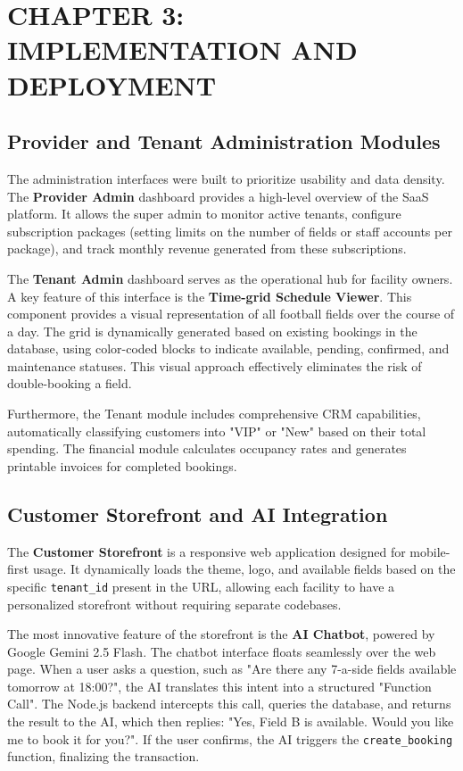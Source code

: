 \section*{CHAPTER 3: IMPLEMENTATION AND DEPLOYMENT}
\setcounter{section}{3}
\setcounter{subsection}{0}
\setcounter{figure}{0}
\setcounter{table}{0}

\subsection{Provider and Tenant Administration Modules}

The administration interfaces were built to prioritize usability and data density. The \textbf{Provider Admin} dashboard provides a high-level overview of the SaaS platform. It allows the super admin to monitor active tenants, configure subscription packages (setting limits on the number of fields or staff accounts per package), and track monthly revenue generated from these subscriptions.

The \textbf{Tenant Admin} dashboard serves as the operational hub for facility owners. A key feature of this interface is the \textbf{Time-grid Schedule Viewer}. This component provides a visual representation of all football fields over the course of a day. The grid is dynamically generated based on existing bookings in the database, using color-coded blocks to indicate available, pending, confirmed, and maintenance statuses. This visual approach effectively eliminates the risk of double-booking a field.

Furthermore, the Tenant module includes comprehensive CRM capabilities, automatically classifying customers into "VIP" or "New" based on their total spending. The financial module calculates occupancy rates and generates printable invoices for completed bookings.

\subsection{Customer Storefront and AI Integration}

The \textbf{Customer Storefront} is a responsive web application designed for mobile-first usage. It dynamically loads the theme, logo, and available fields based on the specific \texttt{tenant\_id} present in the URL, allowing each facility to have a personalized storefront without requiring separate codebases.

The most innovative feature of the storefront is the \textbf{AI Chatbot}, powered by Google Gemini 2.5 Flash. The chatbot interface floats seamlessly over the web page. When a user asks a question, such as "Are there any 7-a-side fields available tomorrow at 18:00?", the AI translates this intent into a structured "Function Call". The Node.js backend intercepts this call, queries the database, and returns the result to the AI, which then replies: "Yes, Field B is available. Would you like me to book it for you?". If the user confirms, the AI triggers the \texttt{create\_booking} function, finalizing the transaction.

